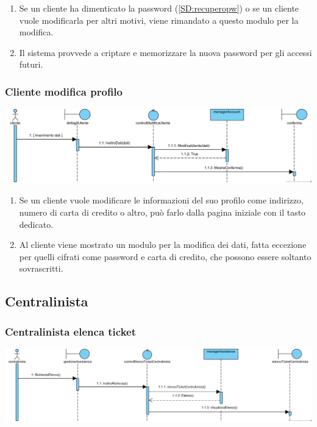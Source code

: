 \documentclass[12pt]{article}
\begin{document}
\begin{enumerate}
\item Se un cliente ha dimenticato la password (\ref{SD:recuperopw}) o se un cliente vuole modificarla per altri motivi, viene rimandato a questo modulo per la modifica.
\item Il sistema provvede a criptare e memorizzare la nuova password per gli accessi futuri.
\end{enumerate}

\subsubsection{Cliente modifica profilo}
\label{SD:modificaprofilo}
\begin{center}
\includegraphics[width=\textwidth]{SequenceDiagram/ClienteProfiloModifica}
\end{center}

\begin{enumerate}
\item Se un cliente vuole modificare le informazioni del suo profilo come indirizzo, numero di carta di credito o altro, può farlo dalla pagina iniziale con il tasto dedicato.
\item Al cliente viene mostrato un modulo per la modifica dei dati, fatta eccezione per quelli cifrati come password e carta di credito, che possono essere soltanto sovrascritti.
\end{enumerate}

\newpage

\subsection{Centralinista}
\subsubsection{Centralinista elenca ticket}
\label{SD:centralinistaelencaticket}

\begin{center}
\includegraphics[width=\textwidth]{SequenceDiagram/CentralinistaTicketElenco}
\end{center}
\end{document}
